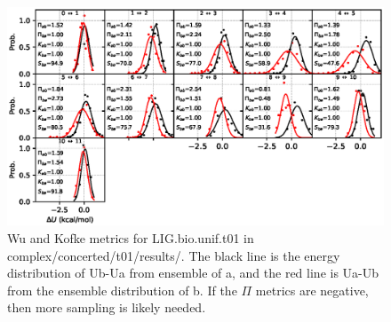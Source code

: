 \documentclass[journal=jctcce,manuscript=article,hyperref=false]{achemso}
\begin{document}
\begin{figure}
\includegraphics[clip,width=6in]{complex.concerted.t01.results..hist.eps}\vspace{-0.3cm}
                        \caption{Wu and Kofke metrics for LIG.bio.unif.t01 in complex/concerted/t01/results/. The black line is the energy distribution of Ub-Ua from ensemble of a, and the red line is Ua-Ub from the ensemble distribution of b. If the $\Pi$ metrics are negative, then more sampling is likely needed.}
\end{figure}
\end{document}
